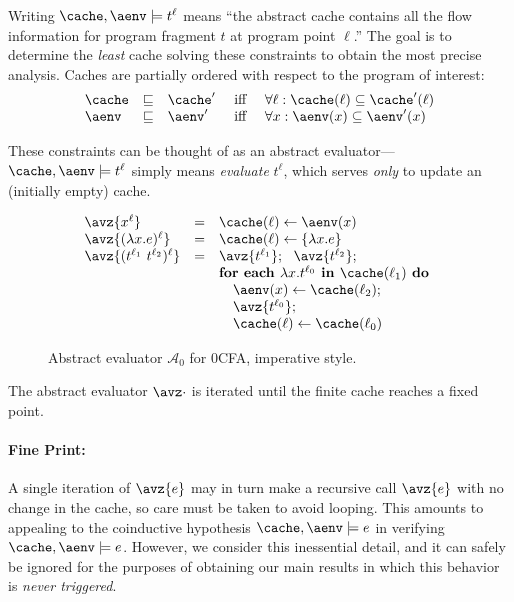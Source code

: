 Writing $\cache,\aenv \models t^\ell$ means ``the abstract cache
contains all the flow information for program fragment $t$ at program
point $\ell$.''  The goal is to determine the {\em least} cache
solving these constraints to obtain the most precise analysis.  Caches
are partially ordered with respect to the program of interest:
\begin{displaymath}
\begin{array}{lllcl}
\cache & \sqsubseteq & \cache' & 
\mbox{ iff } & 
\forall \ell : \cache(\ell) \subseteq \cache'(\ell)\\
\aenv & \sqsubseteq & \aenv' & 
\mbox{ iff } & 
\forall x : \aenv(x) \subseteq \aenv'(x)
\end{array}
\end{displaymath}

These constraints can be thought of as an abstract evaluator---
$\cache,\aenv \models t^\ell$ simply means {\em evaluate} $t^\ell$, which
serves {\em only} to update an (initially empty) cache.

\begin{figure}[h]
\begin{displaymath}
\begin{array}{lcl}
\avz{x^\ell} & = & 
\cache(\ell) \leftarrow \aenv(x)\\
\avz{(\lambda x.e)^\ell} & = & 
\cache(\ell) \leftarrow \{ \lambda x.e \}\\
\avz{(t^{\ell_1}\ t^{\ell_2})^\ell} & = & 
\avz{t^{\ell_1}};\ \ \avz{t^{\ell_2}};\\
\ &\ & \mbox{\bf for each }\lambda x.t^{\ell_0} \mbox{\bf\ in\ } \cache(\ell_1)\mbox{\bf\ do }\\
\ &\ &   \quad   \aenv(x) \leftarrow \cache(\ell_2);\\ 
\ &\ &   \quad   \avz{t^{\ell_0}};\\
\ &\ &   \quad   \cache(\ell) \leftarrow \cache(\ell_0)
\end{array}
\end{displaymath}
\caption{Abstract evaluator $\mathcal{A}_0$ for 0CFA, imperative style.}
\label{fig-0cfa-imperative}
\end{figure}

The abstract evaluator $\avz\cdot$ is iterated until the finite cache
reaches a fixed point.

\paragraph{Fine Print:} A single iteration of $\avz{e}$ may in turn
make a recursive call $\avz{e}$ with no change in the cache, so care
must be taken to avoid looping.  This amounts to appealing to the
coinductive hypothesis $\cache,\aenv \models e$ in verifying
$\cache,\aenv \models e$.  However, we consider this inessential
detail, and it can safely be ignored for the purposes of obtaining our
main results in which this behavior is {\em never triggered}.

